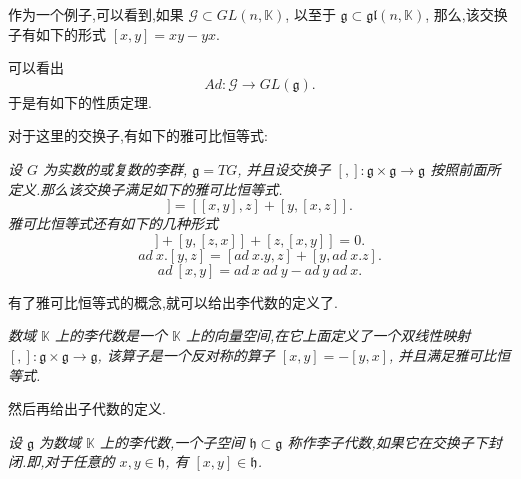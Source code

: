 作为一个例子,可以看到,如果 $\mathcal{G} \subset GL(n, \mathbb{K})$, 以至于 $\mathfrak{g} \subset \mathfrak{gl}(n, \mathbb{K})$, 那么,该交换子有如下的形式 $[x, y] = xy − yx$.

可以看出
\begin{equation*}
	Ad:\mathcal{G}\to GL(\mathfrak{g}).
\end{equation*}
于是有如下的性质定理.


对于这里的交换子,有如下的雅可比恒等式:
\begin{theorem}
	\emph{设 $G$ 为实数的或复数的李群, $\mathfrak{g}=TG$, 并且设交换子 $[,]:\mathfrak{g}\times\mathfrak{g}\to \mathfrak{g}$ 按照前面所定义.那么该交换子满足如下的雅可比恒等式.
	\begin{equation*}
		[x, [y, z]] = [[x, y], z] + [y, [x, z]].
	\end{equation*}
	雅可比恒等式还有如下的几种形式
	\begin{equation*}
		[x, [y, z]] + [y, [z, x]] + [z, [x, y]] = 0.
	\end{equation*}
	\begin{equation*}
		ad~x.[y, z] = [ad~x.y, z] + [y, ad~x.z].
	\end{equation*}
	\begin{equation*}
		ad~[x, y] = ad~x~ad~y − ad~y~ad~x.
	\end{equation*}}
\end{theorem}

有了雅可比恒等式的概念,就可以给出李代数的定义了.
\begin{definition}[李代数]
	\emph{数域 $\mathbb{K}$ 上的李代数是一个 $\mathbb{K}$ 上的向量空间,在它上面定义了一个双线性映射 $[,]:\mathfrak{g}\times\mathfrak{g}\to \mathfrak{g}$, 该算子是一个反对称的算子 $[x, y] = −[y, x]$, 并且满足雅可比恒等式.}
\end{definition}

然后再给出子代数的定义.
\begin{definition}
	\emph{设 $\mathfrak{g}$ 为数域 $\mathbb{K}$ 上的李代数,一个子空间 $\mathfrak{h}\subset \mathfrak{g}$ 称作李子代数,如果它在交换子下封闭.即,对于任意的 $x,y\in \mathfrak{h}$, 有 $[x,y]\in\mathfrak{h}$.}
\end{definition}

